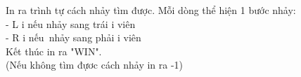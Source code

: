 In ra trình tự cách nhảy tìm được. Mỗi dòng thể hiện 1 bước nhảy:   
\\   - L i  nếu nhảy sang trái i viên   
\\   - R i  nếu nhảy sang phải i viên   
\\   Kết thúc in ra "WIN".   
\\   (Nếu không tìm đựơc cách nhảy in ra -1)   
\\
\\
\\

\